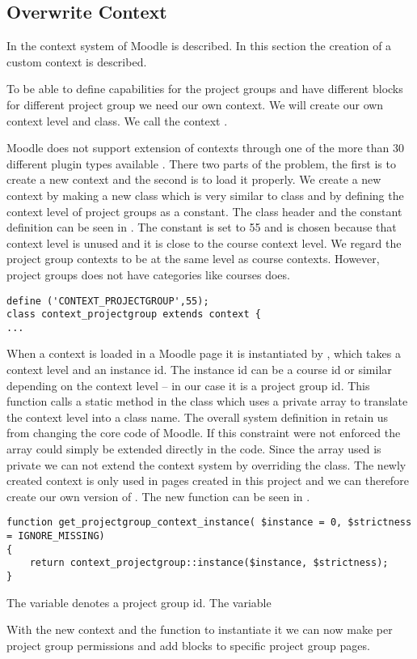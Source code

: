 \subsection{Overwrite Context}
In   the context system of Moodle is described.
In this section the creation of a custom context is described. 

To be able to define capabilities for the project groups and have different blocks for different project group we need our own context.
We will create our own context level and class.
We call the context . 

Moodle does not support extension of contexts through one of the more than 30 different plugin types available \cite{plugin}. 
There two parts of the problem, the first is to create a new context and the second is to load it properly. 
We create a new context by making a new class which is very similar to  class and by defining the context level of project groups as a constant. 
The class header and the constant definition can be seen in . 
The constant is set to 55 and is chosen because that context level is unused and it is close to the course context level. 
We regard the project group contexts to be at the same level as course contexts. 
However, project groups does not have categories like courses does.

\begin{lstlisting}[style=phpCode, caption=\myCaption{The context\_projectgroup class header and constant definition}, label=codeprojectgroupcontext]
define ('CONTEXT_PROJECTGROUP',55);
class context_projectgroup extends context {
...
\end{lstlisting}

When a context is loaded in a Moodle page it is instantiated by , which takes a context level and an instance id. 
The instance id can be a course id or similar depending on the context level -- in our case it is a project group id. 
This function calls a static method in the  class which uses a private array to translate the context level into a class name.
The overall system definition in  retain us from changing the core code of Moodle. 
If this constraint were not enforced the array could simply be extended directly in the code.  
Since the array used is private we can not extend the context system by overriding the  class. 
The newly created context is only used in pages created in this project and we can therefore create our own version of . 
The new function can be seen in .
\begin{lstlisting}[style=phpCode, caption=\myCaption{The function to get projectgroup context}, label=codeprojectgroupcontextinstance]
function get_projectgroup_context_instance( $instance = 0, $strictness = IGNORE_MISSING) 
{ 
    return context_projectgroup::instance($instance, $strictness);
}
\end{lstlisting}
The  variable denotes a project group id.
The  variable 

With the new context and the function to instantiate it we can now make per project group permissions and add blocks to specific project group pages. 